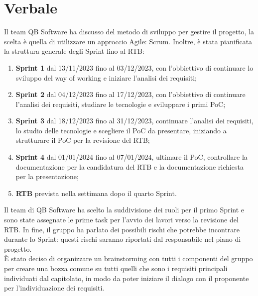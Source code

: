 \documentclass[12pt]{article}
\begin{document}
    \section{Verbale}
		Il team QB Software ha discusso del metodo di sviluppo per gestire il progetto, la scelta è quella di utilizzare un approccio Agile: Scrum. Inoltre, è stata pianificata la struttura generale degli Sprint fino al RTB:
		\begin{enumerate}
			\item \textbf{Sprint 1} dal 13/11/2023 fino al 03/12/2023, con l'obbiettivo di continuare lo sviluppo del way of working e iniziare l'analisi dei requisiti; 
			\item \textbf{Sprint 2} dal 04/12/2023 fino al 17/12/2023, con l'obbiettivo di continuare l'analisi dei requisiti, studiare le tecnologie e sviluppare i primi PoC;
			\item \textbf{Sprint 3} dal 18/12/2023 fino al 31/12/2023, continuare l'analisi dei requisiti, lo studio delle tecnologie e scegliere il PoC da presentare, iniziando a strutturare il PoC per la revisione del RTB;
			\item \textbf{Sprint 4} dal 01/01/2024 fino al 07/01/2024, ultimare il PoC, controllare la documentazione per la candidatura del RTB e la documentazione richiesta per la presentazione;
			\item \textbf{RTB} prevista nella settimana dopo il quarto Sprint.
		\end{enumerate}
		\noindent
		Il team di QB Software ha scelto la suddivisione dei ruoli per il primo Sprint e sono state assegnate le prime task per l'avvio dei lavori verso la revisione del RTB. In fine, il gruppo ha parlato dei possibili rischi che potrebbe incontrare durante lo Sprint: questi rischi saranno riportati dal responsabile nel piano di progetto.
		\\
		È stato deciso di organizzare un brainstorming con tutti i componenti del gruppo per creare una bozza comune su tutti quelli che sono i requisiti principali individuati dal capitolato, in modo da poter iniziare il dialogo con il proponente per l'individuazione dei requisiti.
		
\end{document}
